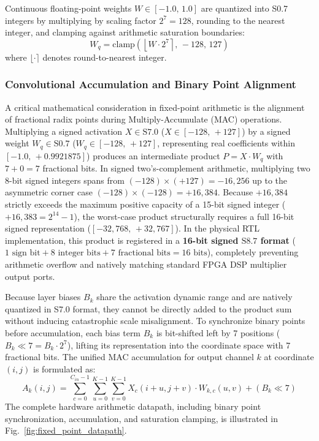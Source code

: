 \documentclass[conference]{IEEEtran}
\begin{document}
Continuous floating-point weights $W \in [-1.0,\, 1.0]$ are quantized into S0.7 integers by multiplying by scaling factor $2^7 = 128$, rounding to the nearest integer, and clamping against arithmetic saturation boundaries:
\begin{equation}
W_q = \text{clamp}\left(\left\lfloor W \cdot 2^7 \right\rceil,\, -128,\, 127\right)
\label{eq:weight_quant}
\end{equation}
where $\lfloor \cdot \rceil$ denotes round-to-nearest integer.

\subsubsection{Convolutional Accumulation and Binary Point Alignment}
A critical mathematical consideration in fixed-point arithmetic is the alignment of fractional radix points during Multiply-Accumulate (MAC) operations. Multiplying a signed activation $X \in \text{S7.0}$ ($X \in [-128,\, +127]$) by a signed weight $W_q \in \text{S0.7}$ ($W_q \in [-128,\, +127]$, representing real coefficients within $[-1.0,\, +0.9921875]$) produces an intermediate product $P = X \cdot W_q$ with $7 + 0 = 7$ fractional bits. In signed two's-complement arithmetic, multiplying two 8-bit signed integers spans from $(-128) \times (+127) = -16,256$ up to the asymmetric corner case $(-128) \times (-128) = +16,384$. Because $+16,384$ strictly exceeds the maximum positive capacity of a 15-bit signed integer ($+16,383 = 2^{14} - 1$), the worst-case product structurally requires a full 16-bit signed representation ($[-32,768,\, +32,767]$). In the physical RTL implementation, this product is registered in a \textbf{16-bit signed $\text{S8.7}$ format} ($1\text{ sign bit} + 8\text{ integer bits} + 7\text{ fractional bits} = 16\text{ bits}$), completely preventing arithmetic overflow and natively matching standard FPGA DSP multiplier output ports.

Because layer biases $B_k$ share the activation dynamic range and are natively quantized in S7.0 format, they cannot be directly added to the product sum without inducing catastrophic scale misalignment. To synchronize binary points before accumulation, each bias term $B_k$ is bit-shifted left by 7 positions ($B_k \ll 7 = B_k \cdot 2^7$), lifting its representation into the coordinate space with 7 fractional bits. The unified MAC accumulation for output channel $k$ at coordinate $(i, j)$ is formulated as:
\begin{equation}
A_k(i, j) = \sum_{c=0}^{C_{in}-1} \sum_{u=0}^{K-1} \sum_{v=0}^{K-1} X_c(i+u, j+v) \cdot W_{k,c}(u, v) + \left(B_k \ll 7\right)
\label{eq:mac_accumulation}
\end{equation}
The complete hardware arithmetic datapath, including binary point synchronization, accumulation, and saturation clamping, is illustrated in Fig.~\ref{fig:fixed_point_datapath}.
\end{document}
